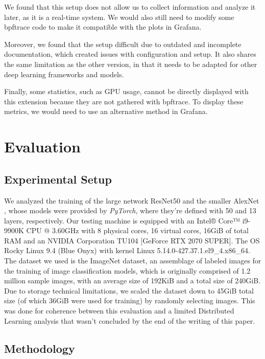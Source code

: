 \documentclass[conference]{IEEEtran}
\begin{document}
We found that this setup does not allow us to collect information and analyze it later, as it is a real-time system.
We would also still need to modify some bpftrace code to make it compatible with the plots in Grafana.

Moreover, we found that the setup difficult due to outdated and incomplete documentation, which created issues with configuration and setup.
It also shares the same limitation as the other version, in that it needs to be adapted for other deep learning frameworks and models.

Finally, some statistics, such as GPU usage, cannot be directly displayed with this extension because they are not gathered with bpftrace. To display these metrics, we would need to use an alternative method in Grafana.

\section{Evaluation}

\subsection{Experimental Setup}

We analyzed the training of the large network ResNet50 \cite{resnet50} and the smaller AlexNet \cite{alexnet}, whose models were
provided by \textit{PyTorch}, where they're defined with 50 and 13 layers, respectively. Our testing machine is equipped with an Intel® Core™ i9-9900K CPU @ 3.60GHz with
8 physical cores, 16 virtual cores, 16GiB of total RAM and an NVIDIA Corporation TU104 [GeForce RTX 2070 SUPER]. The OS  Rocky Linux 9.4 (Blue Onyx) with kernel Linux 5.14.0-427.37.1.el9\_4.x86\_64. The dataset we used is the ImageNet \cite{imagenet} dataset, an assemblage of labeled images for the training of image classification models, which is originally comprised of 1.2 million sample images, with an average size of 192KiB and a total size of 240GiB. Due to storage technical limitations, we scaled the dataset down to 45GiB total size (of which 36GiB were used for training) by randomly selecting images. This was done for coherence between this evaluation and a limited Distributed Learning analysis that wasn't concluded by the end of the writing of this paper.

\subsection{Methodology}
\end{document}
